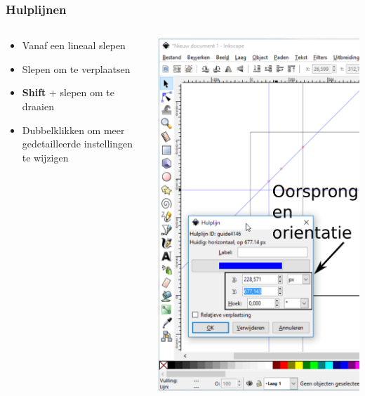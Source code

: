 \documentclass[t]{beamer}
\begin{document}
	\begin{frame}
		\frametitle{Hulplijnen}
		\begin{columns}
				\begin{column}[T]{0.6\textwidth}
					\begin{itemize}
						\item Vanaf een lineaal slepen
						\item Slepen om te verplaatsen
						\item \textbf{Shift} + slepen om te draaien
						\item Dubbelklikken om meer gedetailleerde instellingen te wijzigen
					\end{itemize}
				\end{column}
				\begin{column}[T]{0.4\textwidth}
					\includegraphics[height=0.8\textheight]{fig/inkscape_hulplijnen}
				\end{column}
			\end{columns}
	\end{frame}
\end{document}
